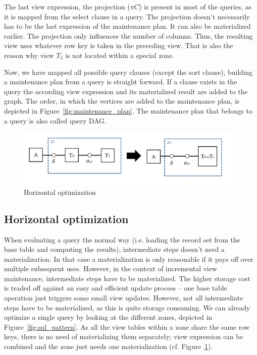 The last view expression, the projection ($\pi C$) is present in most 
of the queries, as it is mapped from the select clause in a query. The 
projection doesn't necessarily has to be the last expression of the 
maintenance plan. It can also be materialized earlier. The projection 
only influences the number of columns. Thus, the resulting view uses 
whatever row key is taken in the preceding view. That is also the reason 
why view $T_5$ is not located within a special zone. 

Now, we have mapped all possible query clauses (except the sort clause),
building a maintenance plan from a query is straight forward. If a clause
exists in the query the according view expression and its materialized
result are added to the graph. The order, in which the vertices are added
to the maintenance plan, is depicted in Figure~\ref{fig:maintenance_plan}.
The maintenance plan that belongs to a query is also called query DAG.

\begin{figure} \centering 
	\includegraphics[width=\linewidth]{figures/SQLPatternOptimization} 
	\caption{Horizontal optimization} \label{fig:horizontal_optimization} 
\end{figure} 

\subsection{Horizontal optimization} 

When evaluating a query the normal way (i.e. loading the record set from 
the base table and computing the results), intermediate steps doesn't 
need a materialization. In that case a materialization is only 
reasonable if it pays off over multiple subsequent uses. However, in the 
context of incremental view maintenance, intermediate steps have to be 
materialized. The higher storage cost is traded off against an easy and 
efficient update process -- one base table operation just triggers some 
small view updates. However, not all intermediate steps have to be 
materialized, as this is quite storage consuming. We can already 
optimize a single query by looking at the different zones, depicted in 
Figure~\ref{fig:sql_pattern}. As all the view tables within a zone share 
the same row keys, there is no need of materializing them separately; 
view expression can be combined and the zone just needs one 
materialization (cf. Figure~\ref{fig:horizontal_optimization}). 

